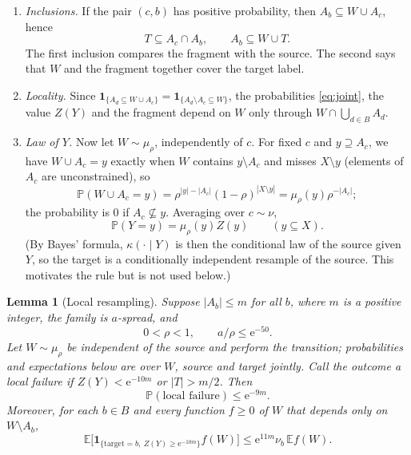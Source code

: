 \documentclass[11pt]{article}
\newtheorem{lemma}[theorem]{Lemma}
\numberwithin{equation}{section}
\newcommand{\PP}{\mathbb P}
\newcommand{\EE}{\mathbb E}
\newcommand{\ind}{\mathbf 1}
\newcommand{\ee}{\mathrm e}
\begin{document}
\begin{enumerate}[label=(O\arabic*),itemsep=2pt,topsep=3pt]
 \item\label{obs:incl} \emph{Inclusions.} If the pair $(c,b)$ has
 positive probability, then $A_b\subseteq W\cup A_c$, hence
 \begin{equation}\label{eq:two-inclusions}
  T\subseteq A_c\cap A_b,\qquad A_b\subseteq W\cup T.
 \end{equation}
 The first inclusion compares the fragment with the source. The second
 says that $W$ and the fragment together cover the target label.
 \item\label{obs:local} \emph{Locality.} Since
 $\ind_{\{A_d\subseteq W\cup A_c\}}=\ind_{\{A_d\setminus A_c\subseteq W\}}$,
 the probabilities \eqref{eq:joint}, the value $Z(Y)$ and the fragment
 depend on $W$ only through $W\cap\bigcup_{d\in B}A_d$.
 \item\label{obs:law} \emph{Law of $Y$.} Now let $W\sim\mu_\rho$,
 independently of $c$. For fixed $c$ and $y\supseteq A_c$, we have
 $W\cup A_c=y$ exactly when $W$ contains $y\setminus A_c$ and misses
 $X\setminus y$ (elements of $A_c$ are unconstrained), so
 \[
  \PP(W\cup A_c=y)=\rho^{|y|-|A_c|}(1-\rho)^{|X\setminus y|}
  =\mu_\rho(y)\rho^{-|A_c|};
 \]
 the probability is $0$ if $A_c\not\subseteq y$. Averaging over
 $c\sim\nu$,
 \begin{equation}\label{eq:density}
  \PP(Y=y)=\mu_\rho(y)Z(y)\qquad(y\subseteq X).
 \end{equation}
 (By Bayes' formula, $\kappa(\cdot\mid Y)$ is then the conditional law of
 the source given $Y$, so the target is a conditionally independent
 resample of the source. This motivates the rule but is not used below.)
\end{enumerate}

\begin{lemma}[Local resampling]\label{lem:local}
Suppose $|A_b|\le m$ for all $b$, where $m$ is a positive integer, the
family is $a$-spread, and
\[
 0<\rho<1,\qquad a/\rho\le\ee^{-50}.
\]
Let $W\sim\mu_\rho$ be independent of the source and perform the
transition; probabilities and expectations below are over $W$, source and
target jointly. Call the outcome a \emph{local failure} if
$Z(Y)<\ee^{-10m}$ or $|T|>m/2$. Then
\begin{equation}\label{eq:local-failure}
 \PP(\text{local failure})\le\ee^{-9m}.
\end{equation}
Moreover, for each $b\in B$ and every function $f\ge0$ of $W$ that depends
only on $W\setminus A_b$,
\begin{equation}\label{eq:distortion}
 \EE\bigl[\ind_{\{\mathrm{target}=b,\ Z(Y)\ge\ee^{-10m}\}}f(W)\bigr]
 \le\ee^{11m}\nu_b\,\EE f(W).
\end{equation}
\end{lemma}
\end{document}
